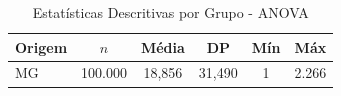\begin{table}[H]
\centering
\small
\caption{Estatísticas Descritivas por Grupo - ANOVA}
\label{tab:anova_grupos}
\begin{tabular}{lccccc}
\toprule
\textbf{Origem} & \textbf{$n$} & \textbf{Média} & \textbf{DP} & \textbf{Mín} & \textbf{Máx} \\
\midrule
MG & 100.000 & 18,856 & 31,490 & 1 & 2.266 \\
\bottomrule
\end{tabular}
\end{table}